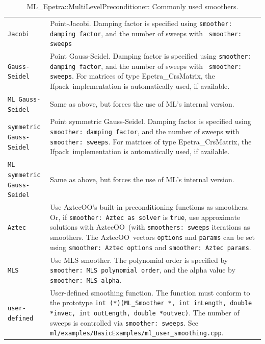 \documentclass{article}[11pt]
\newcommand{\Aztecoo}  {{\sc AztecOO}}
\newcommand{\aztecoo}  {{\Aztecoo}}
\newcommand{\ifpack}  {{\sc Ifpack}}
\begin{document}
\begin{table}[tbh]
\begin{center}
\begin{tabular}{ | p{4.5cm} | p{10cm} | }
\hline
\verb!Jacobi! & Point-Jacobi. Damping factor is specified using
{\tt smoother: damping factor}, and the number of sweeps with {\tt
  smoother: sweeps} \\ 
\verb!Gauss-Seidel! & Point Gauss-Seidel.  Damping factor is specified using
{\tt smoother: damping factor}, and the number of sweeps with {\tt
 smoother: sweeps}.  For matrices of type Epetra\_CrsMatrix, the \ifpack\
implementation is automatically used, if available. \\
\verb!ML Gauss-Seidel! & Same as above, but forces the use of ML's internal
version.\\
\verb!symmetric Gauss-Seidel! & Point symmetric Gauss-Seidel.  Damping factor is specified using
{\tt smoother: damping factor}, and the number of sweeps with {\tt
 smoother: sweeps}.
For matrices of type Epetra\_CrsMatrix, the \ifpack\
implementation is automatically used, if available. \\
\verb!ML symmetric Gauss-Seidel! & Same as above, but forces the use of ML's
internal version.\\
\verb!Aztec! & Use \aztecoo's built-in preconditioning functions as
smoothers. Or, if {\tt smoother: Aztec as solver} is {\tt true},  use
approximate solutions with \aztecoo~(with {\tt smoothers: sweeps}
iterations as smoothers. 
The \aztecoo~vectors \verb!options! and {\tt params} can be set using
{\tt smoother: Aztec options} and {\tt smoother: Aztec params}. \\
\verb!MLS! & Use MLS smoother. The polynomial order is specified by {\tt
  \tt smoother: MLS polynomial order}, and the alpha value by {\tt
  smoother: MLS alpha}.\\ 
\verb!user-defined! & User-defined smoothing function.  The function must conform to
the prototype {\tt int (*)(ML\_Smoother *, int inLength, double *invec, int outLength,
 double *outvec)}. The number of sweeps is controlled via {\tt smoother: sweeps}. See
{\tt ml/examples/BasicExamples/ml\_user\_smoothing.cpp}.\\
\hline
\end{tabular}
\caption{ML\_Epetra::MultiLevelPreconditioner: Commonly used smoothers.} 
\label{tab:ml:smoother}
\end{center}
\end{table}
\end{document}
